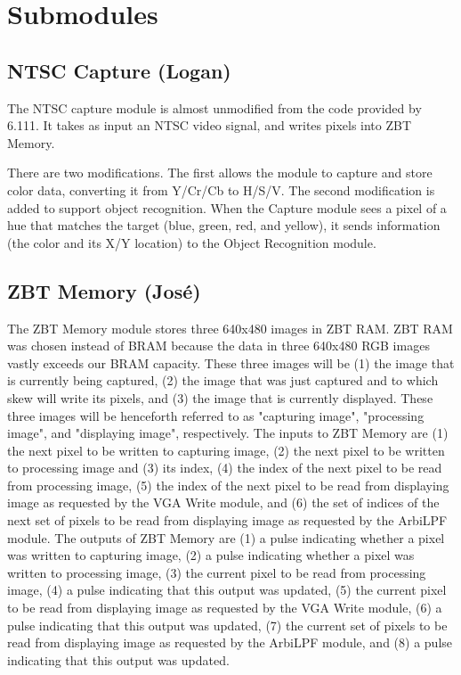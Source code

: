 \documentclass[10pt]{article}
\begin{document}
\section{Submodules}
\subsection{NTSC Capture (Logan)}
The NTSC capture module is almost unmodified from the code provided by 6.111. It takes as input an NTSC video signal, and writes pixels into ZBT Memory.

There are two modifications. The first allows the module to capture and store color data, converting it from Y/Cr/Cb to H/S/V. The second modification is added to support object recognition. When the Capture module sees a pixel of a hue that matches the target (blue, green, red, and yellow), it sends information (the color and its X/Y location) to the Object Recognition module.

\subsection{ZBT Memory (Jos\'{e})}
The ZBT Memory module stores three 640x480 images in ZBT RAM. ZBT RAM was chosen instead of BRAM because the data in three 640x480 RGB images vastly exceeds our BRAM capacity. These three images will be (1) the image that is currently being captured, (2) the image that was just captured and to which skew will write its pixels, and (3) the image that is currently displayed. These three images will be henceforth referred to as "capturing image", "processing image", and "displaying image", respectively. The inputs to ZBT Memory are (1) the next pixel to be written to capturing image, (2) the next pixel to be written to processing image and (3) its index, (4) the index of the next pixel to be read from processing image, (5) the index of the next pixel to be read from displaying image as requested by the VGA Write module, and (6) the set of indices of the next set of pixels to be read from displaying image as requested by the ArbiLPF module. The outputs of ZBT Memory are (1) a pulse indicating whether a pixel was written to capturing image, (2) a pulse indicating whether a pixel was written to processing image, (3) the current pixel to be read from processing image, (4) a pulse indicating that this output was updated, (5) the current pixel to be read from displaying image as requested by the VGA Write module, (6) a pulse indicating that this output was updated, (7) the current set of pixels to be read from displaying image as requested by the ArbiLPF module, and (8) a pulse indicating that this output was updated.
\end{document}
